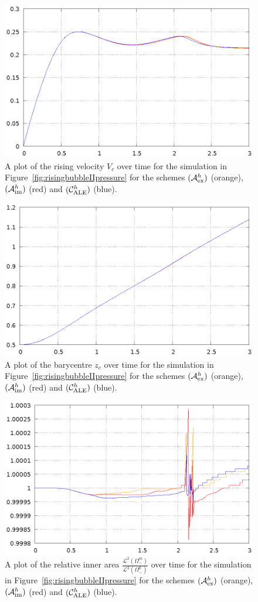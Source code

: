 \documentclass[a4paper,12pt,onecolumn]{article}
\newcommand{\schemeAex}{{\mathcal{A}^h_{\rm ex}}}
\newcommand{\schemeAim}{{\mathcal{A}^h_{\rm im}}}
\newcommand{\schemeALE}{{\mathcal{C}^h_{\rm ALE}}}
\begin{document}
\begin{figure}[htbp]
\centering
\includegraphics[width=.45\textwidth]
{figures/rising_bubble_II_rising_velocity.ps}
\caption{A plot of the rising velocity $V_c$ over time for the simulation in
Figure~\ref{fig:risingbubbleIIpressure} for the schemes $(\schemeAex)$
(orange), $(\schemeAim)$ (red) and $(\schemeALE)$ (blue).}
\label{fig:risingbubbleIIrisingvelocity}
\end{figure}%
\begin{figure}[htbp]
\centering
\includegraphics[width=.45\textwidth]
{figures/rising_bubble_II_barycenter.ps}
\caption{A plot of the barycentre $z_c$ over time for the simulation in
Figure~\ref{fig:risingbubbleIIpressure} for the schemes $(\schemeAex)$
(orange), $(\schemeAim)$ (red) and $(\schemeALE)$ (blue).}
\label{fig:risingbubbleIIbarycenter}
\end{figure}%
\begin{figure}[htbp]
\centering
\includegraphics[width=.45\textwidth]
{figures/rising_bubble_II_inner_volume.ps}
\caption{A plot of the relative inner area
$\frac{\mathcal{L}^2(\Omega^m_-)}{\mathcal{L}^2(\Omega^0_-)}$ over time for the
simulation in Figure~\ref{fig:risingbubbleIIpressure} for the schemes
$(\schemeAex)$ (orange), $(\schemeAim)$ (red) and $(\schemeALE)$ (blue).}
\label{fig:risingbubbleIIinnervolume}
\end{figure}%
\end{document}
